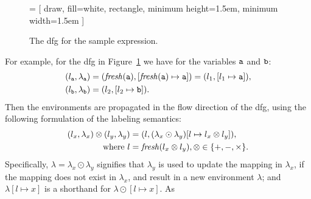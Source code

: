 \begin{figure}[ht]
    \centering
     = [
        draw,
        fill=white,
        rectangle,
        minimum height=1.5em,
        minimum width=1.5em
    ]
    \caption{%
        The \acrshort{dfg} for the sample expression.
    }\label{so:fig:sample_tree}
\end{figure}
For example, for the \gls{dfg} in Figure~\ref{so:fig:sample_tree} we have for
the variables $\texttt{a}$ and $\texttt{b}$:
\begin{equation}
    \begin{aligned}
        (l_{\texttt{a}}, \lambda_{\texttt{a}})
            &= (\operatorname{\mathit{fresh}}(\texttt{a}), [\operatorname{\mathit{fresh}}(\texttt{a})\mapsto{\texttt{a}}])
             = (l_1, [l_1 \mapsto \texttt{a}]), \\
        (l_{\texttt{b}}, \lambda_{\texttt{b}}) &= (l_2, [l_2 \mapsto \texttt{b}]).
    \end{aligned}
    \label{so:eq:variable_env}
\end{equation}
Then the environments are propagated in the flow direction of the \gls{dfg},
using the following formulation of the labeling semantics:
\begin{equation}
    \begin{aligned}
        (l_x, \lambda_x) \otimes (l_y, \lambda_y)
            &= (l, (\lambda_x\odot\lambda_y)
                      [l\mapsto{l_x \otimes l_y}]), \\
            \text{where~} l &= \operatorname{\mathit{fresh}}(l_x \otimes l_y),
                          \otimes\in\{+, -, \times\}.
    \end{aligned}
    \label{so:eq:labeling_semantics}
\end{equation}
Specifically, $\lambda=\lambda_x\odot\lambda_y$ signifies that $\lambda_y$
is used to update the mapping in $\lambda_x$, if the mapping does not
exist in $\lambda_x$, and result in a new environment $\lambda$; and
$\lambda[l\mapsto{x}]$ is a shorthand for $\lambda\odot[l\mapsto{x}]$.  As
